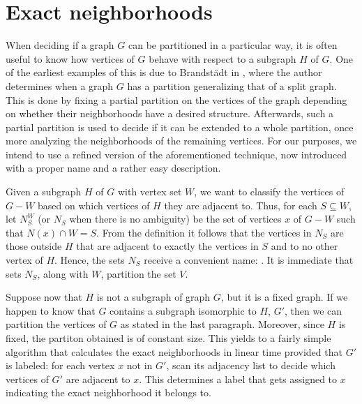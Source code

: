\section{Exact neighborhoods}
\label{sec:exact-neigh}

When deciding if a graph $G$ can be partitioned in a particular way, it is often
useful to know how vertices of $G$ behave with respect to a subgraph $H$ of $G$.
One of the earliest examples of this is due to Brandst\"adt in
\cite{brandstadt1996}, where the author determines when a graph $G$ has a
partition generalizing that of a split graph. This is done by fixing a partial
partition on the vertices of the graph depending on whether their neighborhoods
have a desired structure. Afterwards, such a partial partition is used to decide
if it can be extended to a whole partition, once more analyzing the
neighborhoods of the remaining vertices. For our purposes, we intend to use a
refined version of the aforementioned technique, now introduced with a proper
name and a rather easy description.

Given a subgraph $H$ of $G$ with vertex set $W$, we want to classify the
vertices of $G-W$ based on which vertices of $H$ they are adjacent to. Thus, for
each $S\subseteq W$, let $N^W_S$ (or $N_S$ when there is no ambiguity) be the
set of vertices $x$ of $G-W$ such that $N(x)\cap W = S$. From the definition it
follows that the vertices in $N_S$ are those outside $H$ that are adjacent to
exactly the vertices in $S$ and to no other vertex of $H$. Hence, the sets $N_S$
receive a convenient name: . It is immediate that
sets $N_S$, along with $W$, partition the set $V$.

Suppose now that $H$ is not a subgraph of graph $G$, but it is a fixed graph. If
we happen to know that $G$ contains a subgraph isomorphic to $H$, $G'$, then we
can partition the vertices of $G$ as stated in the last paragraph. Moreover,
since $H$ is fixed, the partiton obtained is of constant size. This yields to a
fairly simple algorithm that calculates the exact neighborhoods in linear time
provided that $G'$ is labeled: for each vertex $x$ not in $G'$, scan its
adjacency list to decide which vertices of $G'$ are adjacent to $x$. This
determines a label that gets assigned to $x$ indicating the exact neighborhood
it belongs to.

